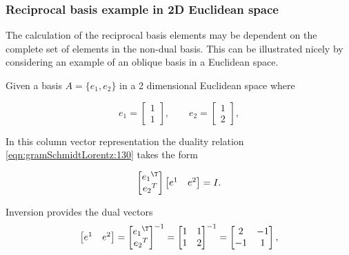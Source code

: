\subsubsection{Reciprocal basis example in 2D Euclidean space}

The calculation of the reciprocal basis elements may be dependent on the complete set of elements in the non-dual basis.  This can be illustrated nicely by considering an example of an oblique basis in a Euclidean space.

Given a basis $A = \{e_1, e_2\}$ in a 2 dimensional Euclidean space where

\begin{equation}\label{eqn:gramSchmidtLorentz:90}
e_1 =
\begin{bmatrix}
1 \\
1
\end{bmatrix},\qquad
e_2 =
\begin{bmatrix}
1 \\
2
\end{bmatrix},
\end{equation}

In this column vector representation the duality relation \ref{eqn:gramSchmidtLorentz:130} takes the form

\begin{equation}\label{eqn:gramSchmidtLorentz:150}
\begin{bmatrix}
{e_1}^\T \\
{e_2}^T
\end{bmatrix}
\begin{bmatrix}
e^1 & e^2
\end{bmatrix} = I.
\end{equation}

Inversion provides the dual vectors
\begin{equation}\label{eqn:gramSchmidtLorentz:170}
\begin{bmatrix}
e^1 & e^2
\end{bmatrix}
=
{
\begin{bmatrix}
{e_1}^\T \\
{e_2}^T
\end{bmatrix}
}^{-1}
=
{\begin{bmatrix}
1 & 1 \\
1 & 2
\end{bmatrix}}^{-1}
=
\begin{bmatrix}
2 & -1 \\
-1 & 1
\end{bmatrix},
\end{equation}

